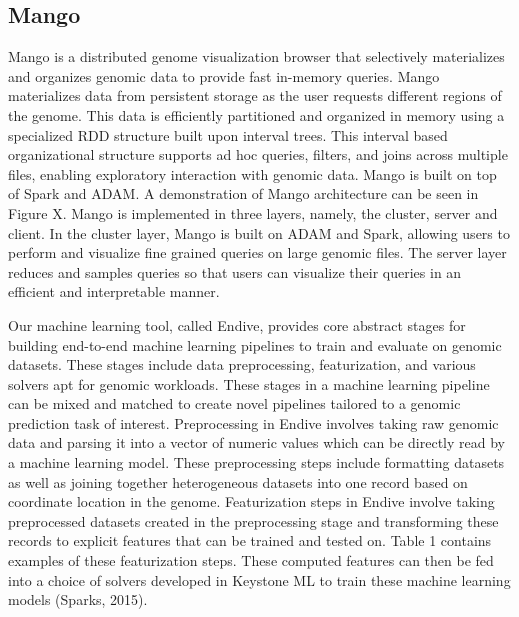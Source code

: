 \documentclass{sig-alternate-05-2015}
\begin{document}
\subsection{Mango}
Mango is a distributed genome visualization browser that selectively materializes and organizes genomic data to provide fast in-memory queries.  Mango materializes data from persistent storage as the user requests different regions of the genome. This data is efficiently partitioned and organized in memory using a specialized RDD structure built upon interval trees. This interval based organizational structure supports ad hoc queries, filters, and joins across multiple files, enabling exploratory interaction with genomic data.  Mango is built on top of Spark and ADAM. A demonstration of Mango architecture can be seen in Figure X. Mango is implemented in three layers, namely, the cluster, server and client. In the cluster layer, Mango is built on ADAM and Spark, allowing users to perform and visualize fine grained queries on large genomic files. The server layer reduces and samples queries so that users can visualize their queries in an efficient and interpretable manner.



Our machine learning tool, called Endive, provides core abstract stages for building end-to-end machine learning pipelines to train and evaluate on genomic datasets. These stages include data preprocessing, featurization, and various solvers apt for genomic workloads. These stages in a machine learning pipeline can be mixed and matched to create novel pipelines tailored to a genomic prediction task of interest.
Preprocessing in Endive involves taking raw genomic data and parsing it into a vector of numeric values which can be directly read by a machine learning model. These preprocessing steps include formatting datasets as well as joining together heterogeneous datasets into one record based on coordinate location in the genome.
Featurization steps in Endive involve taking preprocessed datasets created in the preprocessing stage and transforming these records to explicit features that can be trained and tested on. Table 1 contains examples of these featurization steps. These computed features can then be fed into a choice of solvers developed in Keystone ML to train these machine learning models (Sparks, 2015).
\end{document}
